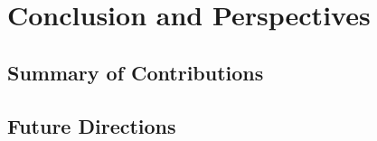 \chapter{Conclusion and Perspectives}
\label{ch:conclusion}

\section{Summary of Contributions}
\section{Future Directions}
